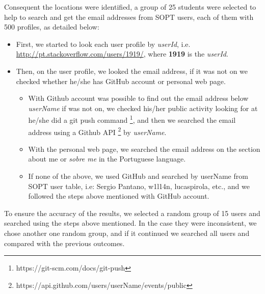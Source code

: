 Consequent the locations were identified, a group of 25 students  were selected to help to search and get the email addresses from SOPT users, each of them with 500 profiles, as detailed below:
\begin{itemize}
    \item First, we started to look each user profile by \textit{userId}, i.e. \url{http://pt.stackoverflow.com/users/1919/}, where \textbf{1919} is the \textit{userId}.
    \item Then, on the user profile, we looked the email address, if it was not on we checked whether he/she has GitHub account or personal web page. 
        \begin{itemize}
            \item With Github account was possible to find out the email address below \textit{userName} if was not on, we checked his/her public activity looking for at he/she did a git push command \footnote{https://git-scm.com/docs/git-push}, and then we searched the email address using a Github API \footnote{https://api.github.com/users/userName/events/public} by \textit{userName}.
            \item With the personal web page, we searched the email address on the section about me or \textit{sobre me} in the Portuguese language.
            \item If none of the above, we used GitHub and searched by userName from SOPT user table, i.e: Sergio Pantano, w1l14n, lucaspirola, etc., and we followed the steps above mentioned with GitHub account.                 
       \end{itemize}            
   \end{itemize} 
To ensure the accuracy of the results, we selected a random group of 15 users and searched using the steps above mentioned. In the case they were inconsistent, we chose another one random group, and if it continued we searched all users and compared with the previous outcomes.

